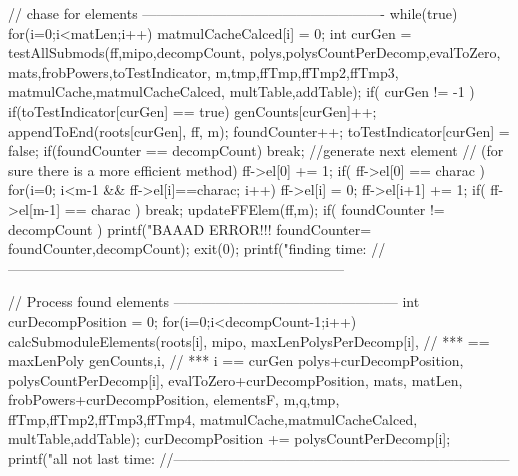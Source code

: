 \begin{ccode}[caption={[\texttt{unsigned long long processFiniteField} aus 
 \url{../Sage/enumeratePCNs.c}]Aus \url{../Sage/enumeratePCNs.c}},
  label=lst:processFiniteField]
{    // chase for elements ----------------------------------------------------
    while(true){
        for(i=0;i<matLen;i++) matmulCacheCalced[i] = 0;
        int curGen = testAllSubmods(ff,mipo,decompCount,
                polys,polysCountPerDecomp,evalToZero,
                mats,frobPowers,toTestIndicator,
                m,tmp,ffTmp,ffTmp2,ffTmp3,
                matmulCache,matmulCacheCalced,
                multTable,addTable);
        if( curGen != -1 ){
            if(toTestIndicator[curGen] == true){
                genCounts[curGen]++;
                appendToEnd(roots[curGen], ff, m);
                foundCounter++;
                toTestIndicator[curGen] = false;
            }
            if(foundCounter == decompCount) break;
        }
        //generate next element
        // (for sure there is a more efficient method)
        ff->el[0] += 1;
        if( ff->el[0] == charac ){
            for(i=0; i<m-1 && ff->el[i]==charac; i++){
                ff->el[i] = 0;
                ff->el[i+1] += 1;
            }
            if( ff->el[m-1] == charac )
                break;
        }
        updateFFElem(ff,m);
    }
    if( foundCounter != decompCount ){
        printf("BAAAD ERROR!!! foundCounter=%
                foundCounter,decompCount);
        exit(0);
    }
    printf("finding time: %
    //------------------------------------------------------------------------
    


    // Process found elements ------------------------------------------------
    int curDecompPosition = 0;
    for(i=0;i<decompCount-1;i++){
        calcSubmoduleElements(roots[i], mipo,
                maxLenPolysPerDecomp[i],  // *** == maxLenPoly
                genCounts,i, // *** i == curGen
                polys+curDecompPosition, polysCountPerDecomp[i],
                evalToZero+curDecompPosition,
                mats, matLen, frobPowers+curDecompPosition,
                elementsF,
                m,q,tmp,
                ffTmp,ffTmp2,ffTmp3,ffTmp4,
                matmulCache,matmulCacheCalced,
                multTable,addTable);
        curDecompPosition += polysCountPerDecomp[i];
    }
    printf("all not last time: %
    //------------------------------------------------------------------------
    
}
\end{ccode}
